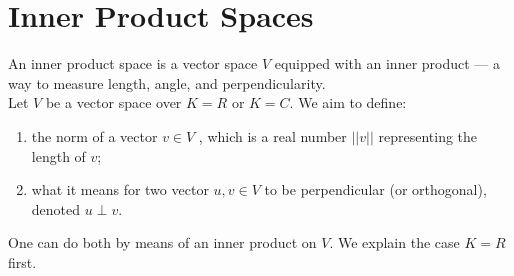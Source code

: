 \documentclass{article}
\begin{document}
\section{Inner Product Spaces}

An inner product space is a vector space $V$ equipped with an inner product --- a way to measure length, angle, and perpendicularity.\\
Let $V$ be a vector space over $K = R$ or $K = C$. We aim to define:
\begin{enumerate}
    \item the norm of a vector $v \in V$ , which is a real number $||v||$ representing the length of $v$;
    \item what it means for two vector $u, v \in V$ to be perpendicular (or orthogonal), denoted $u \perp v$.
\end{enumerate}
One can do both by means of an inner product on $V$. We explain the case $K = R$ first.
\end{document}
